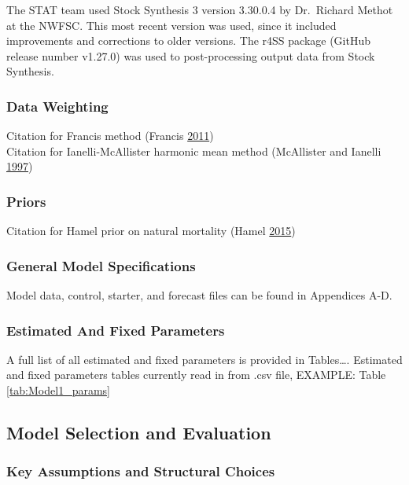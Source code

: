 \documentclass[12pt,]{article}
\begin{document}
The STAT team used Stock Synthesis 3 version 3.30.0.4 by Dr.~Richard
Methot at the NWFSC. This most recent version was used, since it
included improvements and corrections to older versions. The r4SS
package (GitHub release number v1.27.0) was used to post-processing
output data from Stock Synthesis.

\subsubsection{Data Weighting}\label{data-weighting}

Citation for Francis method (Francis
\protect\hyperlink{ref-Francis2011}{2011})\\
Citation for Ianelli-McAllister harmonic mean method (McAllister and
Ianelli \protect\hyperlink{ref-McAllister1997}{1997})

\subsubsection{Priors}\label{priors}

Citation for Hamel prior on natural mortality (Hamel
\protect\hyperlink{ref-Hamel2015}{2015})

\subsubsection{General Model
Specifications}\label{general-model-specifications}

Model data, control, starter, and forecast files can be found in
Appendices A-D.

\subsubsection{Estimated And Fixed
Parameters}\label{estimated-and-fixed-parameters}

A full list of all estimated and fixed parameters is provided in
Tables\ldots{}. Estimated and fixed parameters tables currently read in
from .csv file, EXAMPLE: Table \ref{tab:Model1_params}

\subsection{Model Selection and
Evaluation}\label{model-selection-and-evaluation}

\subsubsection{Key Assumptions and Structural
Choices}\label{key-assumptions-and-structural-choices}
\end{document}
